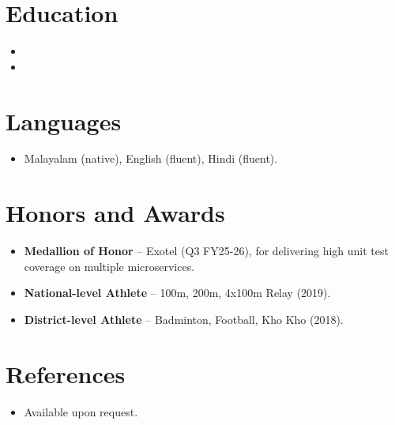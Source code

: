 \documentclass[11pt,a4paper,sans]{moderncv}
\begin{document}

\section{Education}
\vspace{1pt}
\begin{itemize}

\item{}

\vspace{3pt}

\item{}

\end{itemize}


\section{Languages}
\vspace{1pt}
\begin{itemize}
\item Malayalam (native), English (fluent), Hindi (fluent).
\end{itemize}


\section{Honors and Awards}
\vspace{1pt}
\begin{itemize}
\item{\textbf{Medallion of Honor} -- Exotel (Q3 FY25-26), for delivering high unit test coverage on multiple microservices.}
\item{\textbf{National-level Athlete} -- 100m, 200m, 4x100m Relay (2019).}
\item{\textbf{District-level Athlete} -- Badminton, Football, Kho Kho (2018).}
\end{itemize}


\section{References}
\vspace{1pt}
\begin{itemize}
\item{Available upon request.}
\end{itemize}
\end{document}
